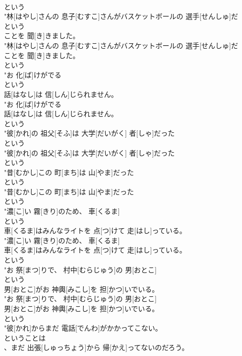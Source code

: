 \documentclass[8pt]{extreport}
\begin{document}
\begin{CJK}{UTF8}{min}
\\	という
\\	"林[はやし]さんの 息子[むすこ]さんがバスケットボールの 選手[せんしゅ]だ
\\	という
\\	ことを 聞[き]きました。
\\	"林[はやし]さんの 息子[むすこ]さんがバスケットボールの 選手[せんしゅ]だ
\\	ことを 聞[き]きました。
\\	という
\\	"お 化[ば]けがでる
\\	という
\\	話[はなし]は 信[しん]じられません。
\\	"お 化[ば]けがでる
\\	話[はなし]は 信[しん]じられません。
\\	という
\\	"彼[かれ]の 祖父[そふ]は 大学[だいがく] 者[しゃ]だった
\\	という
\\	"彼[かれ]の 祖父[そふ]は 大学[だいがく] 者[しゃ]だった
\\	という
\\	"昔[むかし]この 町[まち]は 山[やま]だった
\\	という
\\	"昔[むかし]この 町[まち]は 山[やま]だった
\\	という
\\	"濃[こ]い 霧[きり]のため、 車[くるま]
\\	という
\\	車[くるま]はみんなライトを 点[つ]けて 走[はし]っている。
\\	"濃[こ]い 霧[きり]のため、 車[くるま]
\\	車[くるま]はみんなライトを 点[つ]けて 走[はし]っている。
\\	という
\\	"お 祭[まつ]りで、 村中[むらじゅう]の 男[おとこ]
\\	という
\\	男[おとこ]がお 神輿[みこし]を 担[かつ]いでいる。
\\	"お 祭[まつ]りで、 村中[むらじゅう]の 男[おとこ]
\\	男[おとこ]がお 神輿[みこし]を 担[かつ]いでいる。
\\	という
\\	"彼[かれ]からまだ 電話[でんわ]がかかってこない。
\\	ということは
\\	、まだ 出張[しゅっちょう]から 帰[かえ]ってないのだろう。

\end{CJK}
\end{document}

